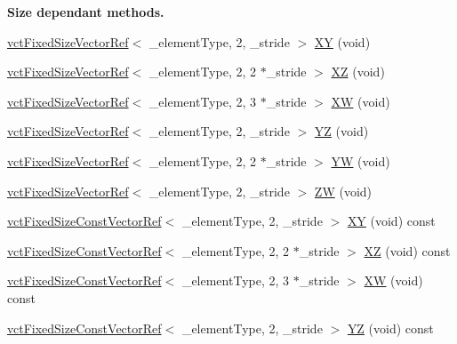 \begin{Indent}{\bf Size dependant methods.}
\begin{DoxyCompactItemize}
\item 
\hyperlink{classvct_fixed_size_vector_ref}{vct\+Fixed\+Size\+Vector\+Ref}$<$ \+\_\+element\+Type, 2, \+\_\+stride $>$ \hyperlink{classvct_fixed_size_vector_base_a3cb4fec662953c304a5bc691f529b0c0}{X\+Y} (void)
\item 
\hyperlink{classvct_fixed_size_vector_ref}{vct\+Fixed\+Size\+Vector\+Ref}$<$ \+\_\+element\+Type, 2, 2 $\ast$\+\_\+stride $>$ \hyperlink{classvct_fixed_size_vector_base_a5a193eb98d206de74e52c7ffd5757c70}{X\+Z} (void)
\item 
\hyperlink{classvct_fixed_size_vector_ref}{vct\+Fixed\+Size\+Vector\+Ref}$<$ \+\_\+element\+Type, 2, 3 $\ast$\+\_\+stride $>$ \hyperlink{classvct_fixed_size_vector_base_a333d923e6e87c199796f8eeaad809505}{X\+W} (void)
\item 
\hyperlink{classvct_fixed_size_vector_ref}{vct\+Fixed\+Size\+Vector\+Ref}$<$ \+\_\+element\+Type, 2, \+\_\+stride $>$ \hyperlink{classvct_fixed_size_vector_base_a82a58b3aa2db78a60d6e5de9a5bfeaee}{Y\+Z} (void)
\item 
\hyperlink{classvct_fixed_size_vector_ref}{vct\+Fixed\+Size\+Vector\+Ref}$<$ \+\_\+element\+Type, 2, 2 $\ast$\+\_\+stride $>$ \hyperlink{classvct_fixed_size_vector_base_a5a87c05d9495660bee668139d75a9fc5}{Y\+W} (void)
\item 
\hyperlink{classvct_fixed_size_vector_ref}{vct\+Fixed\+Size\+Vector\+Ref}$<$ \+\_\+element\+Type, 2, \+\_\+stride $>$ \hyperlink{classvct_fixed_size_vector_base_afa1d2613e918c447722ea8e12d2019ee}{Z\+W} (void)
\item 
\hyperlink{classvct_fixed_size_const_vector_ref}{vct\+Fixed\+Size\+Const\+Vector\+Ref}$<$ \+\_\+element\+Type, 2, \+\_\+stride $>$ \hyperlink{classvct_fixed_size_vector_base_a465e544ec88842a0f0b77e100c8cdce6}{X\+Y} (void) const 
\item 
\hyperlink{classvct_fixed_size_const_vector_ref}{vct\+Fixed\+Size\+Const\+Vector\+Ref}$<$ \+\_\+element\+Type, 2, 2 $\ast$\+\_\+stride $>$ \hyperlink{classvct_fixed_size_vector_base_a1647c63974e92dc246763f5dfc3bc285}{X\+Z} (void) const 
\item 
\hyperlink{classvct_fixed_size_const_vector_ref}{vct\+Fixed\+Size\+Const\+Vector\+Ref}$<$ \+\_\+element\+Type, 2, 3 $\ast$\+\_\+stride $>$ \hyperlink{classvct_fixed_size_vector_base_a2585bb2eeb588b29daec3be755fd86af}{X\+W} (void) const 
\item 
\hyperlink{classvct_fixed_size_const_vector_ref}{vct\+Fixed\+Size\+Const\+Vector\+Ref}$<$ \+\_\+element\+Type, 2, \+\_\+stride $>$ \hyperlink{classvct_fixed_size_vector_base_a72afb171290b48a55e9effb6a34347e1}{Y\+Z} (void) const 

\end{DoxyCompactItemize}
\end{Indent}
